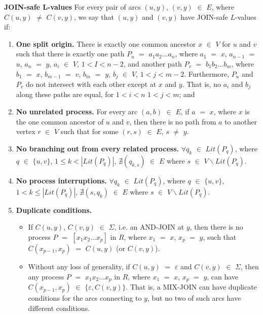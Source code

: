 \begin{defn}\textbf{JOIN-safe L-values} \cite{MalinaoPJS2023}
    \label{JSL}
    For every pair of arcs $(u, y)$, $(v, y)$ $ \in $ $ E $, where $C(u, y)$ $ \neq $ $C(v, y)$, we say that $(u, y)$ and $(v, y)$ have JOIN-safe $L$-values if:

    \begin{enumerate}
        \item \textbf{One split origin.} There is exactly one common ancestor $ x $ $ \in $ $ V $ for $ u $ and $ v $ such that there is exactly one path $ P_u $ $ = $ $ a_1 a_2 \ldots a_n $, where $ a_1 $ $ = $ $ x $, $ a_{n-1} $ $ = $ $ u $, $ a_n $ $ = $ $ y $, $ a_i $ $ \in $ $ V $, $ 1 < I < n - 2 $, and another path $ P_v $ $ = $ $ b_1 b_2 \ldots b_m $, where $ b_1 $ $ = $ $ x $, $ b_{m-1} $ $ = $ $ v $, $ b_m $ $ = $ $ y $, $ b_j $ $ \in $ $ V $, $ 1 < j < m - 2 $. Furthermore, $ P_u $ and $ P_v $ do not intersect with each other except at $ x $ and $ y $. That is, no $ a_i $ and $ b_j $ along these paths are equal, for $ 1 < i < n $ $ 1 < j < m $; and
        \item \textbf{No unrelated process.} For every arc $ (a,b) $ $ \in $ $ E $, if $ a $ $ = $ $ x $, where $x$ is the one common ancestor of $u$ and $v$, then there is no path from $a$ to another vertex $r$ $\in$ $V$ such that for some $(r,s)$ $\in$ $ E $, $s$ $\neq$ $y$.
        \item \textbf{No branching out from every related process.} $\forall q_k $ $ \in $ $ Lit(P_q) $, where $ q $ $ \in $ $ \{u,v\} $, $ 1 \leq k < |Lit(P_q)| $, $ \nexists (q_{k,s}) $ $ \in $ $ E $ where $ s $ $ \in $ $ V \backslash Lit(P_q) $.
        \item \textbf{No process interruptions.} $ \forall q_k $ $ \in $ $ Lit(P_q) $, where $ q $ $ \in $ $ \{u,v\} $, $ 1 < k \leq |Lit(P_q)| $, $ \nexists (s,q_{k}) $ $ \in $ $ E $ where $ s $ $ \in $ $ V \backslash Lit(P_q) $.
        \item \textbf{Duplicate conditions.}
        \begin{itemize}
            \item If $ C(u,y) $, $ C(v,y) $ $ \in $ $ \Sigma $, i.e. an AND-JOIN at $ y $, then there is no process $ P $ $ = $ $ [x_1 x_2 \ldots x_p] $ in $ R $, where $ x_1 $ $ = $ $ x $, $ x_p $ $ = $ $ y $, such that $ C(x_{p-1}, x_p ) $ $ = $ $ C(u,y) $ (or $ C(v,y) $).
            \item Without any loss of generality, if $ C(u,y) $ $ = $ $ \varepsilon $ and $ C(v,y) $ $ \in $ $ \Sigma $, then any process $ P $ $ = $ $ x_1 x_2 \ldots x_p $ in $ R $, where $ x_1 $ $ = $ $ x $, $ x_p $ $ = $ $ y $, can have $ C(x_{p-1}, x_p) $ $ \in $ $ \{\varepsilon, C(v,y)\}$. That is, a MIX-JOIN can have duplicate conditions for the arcs connecting to $y$, but no two of such arcs have different conditions.

\end{itemize}
\end{enumerate}
\end{defn}
